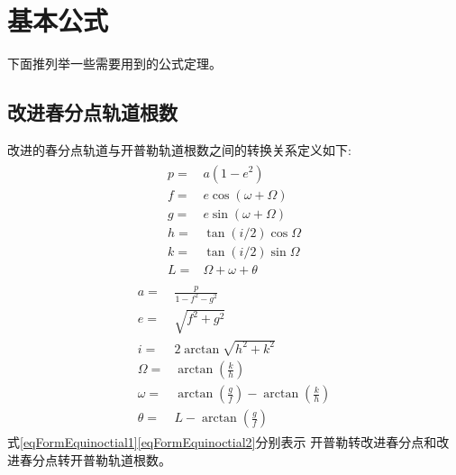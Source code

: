\section{基本公式}
下面推列举一些需要用到的公式定理。

\subsection{改进春分点轨道根数}
改进的春分点轨道与开普勒轨道根数之间的转换关系定义如下\cite{mxubo2016}:
\begin{align}
    \begin{aligned}
        p =& a\left(1-e^{2}\right) \\
        f =& e \cos (\omega+\Omega) \\
        g =& e \sin (\omega+\Omega) \\
        h =& \tan (i / 2) \cos \Omega \\
        k =& \tan (i / 2) \sin \Omega \\
        L =& \Omega+\omega+\theta
    \end{aligned} \label{eqFormEquinoctial1}
\end{align}
\begin{align}
    \begin{aligned}
        a =& \frac{p}{1-f^{2}-g^{2}} \\
        e =& \sqrt{f^{2}+g^{2}} \\
        i =& 2 \arctan \sqrt{h^{2}+k^{2}} \\
        \Omega =& \arctan \left(\frac{k}{h}\right) \\
        \omega =& \arctan \left(\frac{g}{f}\right)-\arctan \left(\frac{k}{h}\right) \\
        \theta =& L-\arctan \left(\frac{g}{f}\right)
    \end{aligned} \label{eqFormEquinoctial2}
\end{align}
式\eqref{eqFormEquinoctial1}\eqref{eqFormEquinoctial2}分别表示
开普勒转改进春分点和改进春分点转开普勒轨道根数。

